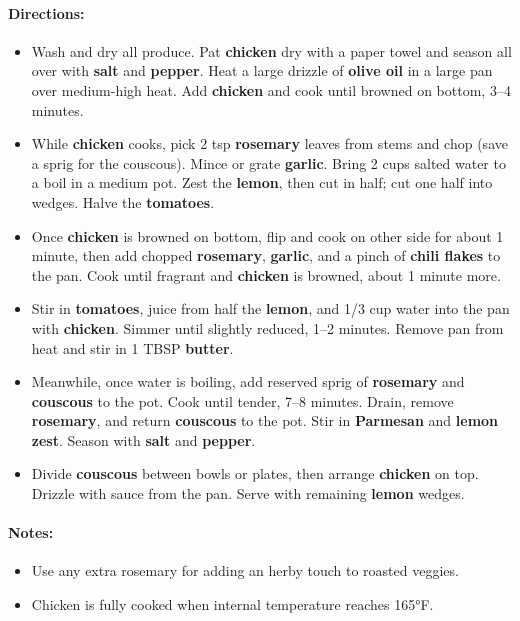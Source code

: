 \documentclass{article}
\begin{document}
\paragraph{Directions:}
\begin{itemize}
    \item Wash and dry all produce. Pat \textbf{chicken} dry with a paper towel and season all over with \textbf{salt} and \textbf{pepper}. Heat a large drizzle of \textbf{olive oil} in a large pan over medium-high heat. Add \textbf{chicken} and cook until browned on bottom, 3–4 minutes.
    \item While \textbf{chicken} cooks, pick 2 tsp \textbf{rosemary} leaves from stems and chop (save a sprig for the couscous). Mince or grate \textbf{garlic}. Bring 2 cups salted water to a boil in a medium pot. Zest the \textbf{lemon}, then cut in half; cut one half into wedges. Halve the \textbf{tomatoes}.
    \item Once \textbf{chicken} is browned on bottom, flip and cook on other side for about 1 minute, then add chopped \textbf{rosemary}, \textbf{garlic}, and a pinch of \textbf{chili flakes} to the pan. Cook until fragrant and \textbf{chicken} is browned, about 1 minute more.
    \item Stir in \textbf{tomatoes}, juice from half the \textbf{lemon}, and 1/3 cup water into the pan with \textbf{chicken}. Simmer until slightly reduced, 1–2 minutes. Remove pan from heat and stir in 1 TBSP \textbf{butter}.
    \item Meanwhile, once water is boiling, add reserved sprig of \textbf{rosemary} and \textbf{couscous} to the pot. Cook until tender, 7–8 minutes. Drain, remove \textbf{rosemary}, and return \textbf{couscous} to the pot. Stir in \textbf{Parmesan} and \textbf{lemon zest}. Season with \textbf{salt} and \textbf{pepper}.
    \item Divide \textbf{couscous} between bowls or plates, then arrange \textbf{chicken} on top. Drizzle with sauce from the pan. Serve with remaining \textbf{lemon} wedges.
\end{itemize}

\paragraph{Notes:}
\begin{itemize}
    \item Use any extra rosemary for adding an herby touch to roasted veggies.
    \item Chicken is fully cooked when internal temperature reaches 165°F.
\end{itemize}
\end{document}
